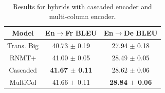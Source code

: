 \documentclass[11pt,a4paper]{article}
\begin{document}
\begin{table}[!htbp]
\centering
\begin{tabular}{ c|c|c}
 \hline
 \hline
Model & En$\rightarrow$Fr BLEU & En$\rightarrow$De  BLEU\\ \hline
Trans. Big    & 40.73 $\pm$ 0.19 & 27.94 $\pm$ 0.18   \\
RNMT+     & 41.00 $\pm$ 0.05  & 28.49  $\pm$ 0.05  \\
Cascaded & \textbf{41.67 $\pm$ 0.11} & 28.62 $\pm$ 0.06\\
 MultiCol & 41.66 $\pm$ 0.11 & \textbf{28.84 $\pm$ 0.06}\\
 \hline
\end{tabular}
\caption{Results for hybrids with cascaded encoder and multi-column encoder.}
\label{table:hybrids-perf}
\end{table}




\end{document}
